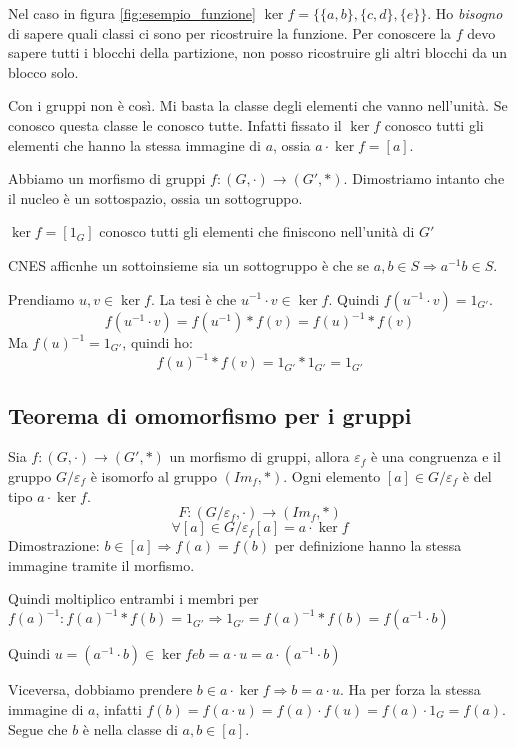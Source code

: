 Nel caso in figura \ref{fig:esempio_funzione} $\ker f = \{ \{a, b \}, \{ c, d \}, \{ e \}\}$. Ho \textit{bisogno} di sapere quali classi ci sono per ricostruire la funzione. Per conoscere la $f$ devo sapere tutti i blocchi della partizione, non posso ricostruire gli altri blocchi da un blocco solo.

Con i gruppi non \`e cos\`i. Mi basta la classe degli elementi che vanno nell'unit\`a. Se conosco questa classe le conosco tutte. Infatti fissato il $\ker f$ conosco tutti gli elementi che hanno la stessa immagine di $a$, ossia $a \cdot \ker f = [a]$.

Abbiamo un morfismo di gruppi $ f : (G, \cdot ) \to (G', \ast)$. Dimostriamo intanto che il nucleo \`e un sottospazio, ossia un sottogruppo.

$\ker f = [1_G]$ conosco tutti gli elementi che finiscono nell'unit\`a di $G'$

CNES afficnhe un sottoinsieme sia un sottogruppo \`e che se $a, b \in S \Rightarrow a^{-1} b \in S$.

Prendiamo $u, v \in \ker f$. La tesi \`e che $u^{-1} \cdot v \in \ker f$. Quindi $f ( u^{-1} \cdot v ) = 1_{G'}$.
\[
f( u^{-1} \cdot v ) = f(u^{-1}) \ast f(v) = f(u)^{-1} \ast f(v)
\]
Ma $f(u)^{-1} = 1_{G'}$, quindi ho:
\[
f(u)^{-1} \ast f(v) = 1_{G'} \ast 1_{G'} = 1_{G'}
\]

\subsection{Teorema di omomorfismo per i gruppi}

Sia $f : (G, \cdot) \to (G', \ast)$ un morfismo di gruppi, allora $\varepsilon_f$ \`e una congruenza e il gruppo $G / \varepsilon_f$ \`e isomorfo al gruppo $(Im_f, \ast)$. Ogni elemento $[a] \in G / \varepsilon_f$ \`e del tipo $a \cdot \ker f$.
\[
F : (G / \varepsilon_f, \cdot) \to (Im_f, \ast)
\]
\[
\forall [a] \in G / \varepsilon_f [a] = a \cdot \ker f
\]
Dimostrazione:
$b \in [a] \Rightarrow f(a) = f(b)$ per definizione hanno la stessa immagine tramite il morfismo.

Quindi moltiplico entrambi i membri per $f(a)^{-1}: f(a)^{-1} \ast f(b) = 1_{G'} \Rightarrow 1_{G'} = f(a)^{-1} \ast f(b) = f(a^{-1} \cdot b)$

Quindi $u = (a^{-1} \cdot b ) \in \ker f e b = a \cdot u = a \cdot (a^{-1} \cdot b)$

Viceversa, dobbiamo prendere $b \in a \cdot \ker f \Rightarrow b = a \cdot u$. Ha per forza la stessa immagine di $a$, infatti $f(b) = f(a \cdot u) = f(a) \cdot f(u) = f(a) \cdot 1_G = f(a)$. Segue che $b$ \`e nella classe di $a, b \in [a]$.

